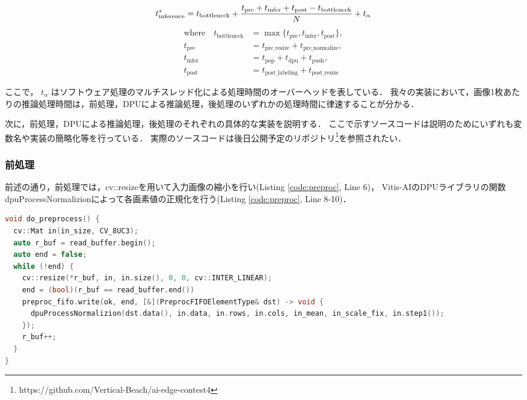 \begin{equation}
  \label{equ:inference-pred}
    t_{\mathrm{inference}}^* = t_{\mathrm{bottleneck}} + \frac{t_{\mathrm{pre}} + t_{\mathrm{infer}} + t_{\mathrm{post}} - t_{\mathrm{bottleneck}}}{N} + t_\alpha \\
\end{equation}
\begin{equation*}
    \begin{split}
      \text{where} \quad
      t_{\mathrm{bottleneck}}  &= \max \{t_{\mathrm{pre}}, t_{\mathrm{infer}}, t_{\mathrm{post}}\}, \\
      t_{\mathrm{pre}}  &= t_{\mathrm{pre\_resize}} + t_{\mathrm{pre\_normalize}}, \\
      t_{\mathrm{infer}} &= t_{\mathrm{pop}} + t_{\mathrm{dpu}} + t_{\mathrm{push}}, \\
      t_{\mathrm{post}} &= t_{\mathrm{post\_labeling}} + t_{\mathrm{post\_resize}}
    \end{split}
\end{equation*}

ここで， $t_\alpha$ はソフトウェア処理のマルチスレッド化による処理時間のオーバーヘッドを表している．
我々の実装において，画像1枚あたりの推論処理時間は，前処理，DPUによる推論処理，後処理のいずれかの処理時間に律速することが分かる．

次に，前処理，DPUによる推論処理，後処理のそれぞれの具体的な実装を説明する．
ここで示すソースコードは説明のためにいずれも変数名や実装の簡略化等を行っている．
実際のソースコードは後日公開予定のリポジトリ\footnote{https://github.com/Vertical-Beach/ai-edge-contest4}を参照されたい．

\subsubsection{前処理}
前述の通り，前処理では，cv::resizeを用いて入力画像の縮小を行い(Listing \ref{code:preproc}, Line 6)，
Vitis-AIのDPUライブラリの関数dpuProcessNormalizionによって各画素値の正規化を行う(Listing \ref{code:preproc}, Line 8-10)．

\setcounter{lstnumber}{1}
\begin{lstlisting}[language=c++,firstnumber=last,caption=do\_preprocess(),label=code:preproc]
void do_preprocess() {
  cv::Mat in(in_size, CV_8UC3);
  auto r_buf = read_buffer.begin();
  auto end = false;
  while (!end) {
    cv::resize(*r_buf, in, in.size(), 0, 0, cv::INTER_LINEAR);
    end = (bool)(r_buf == read_buffer.end())
    preproc_fifo.write(ok, end, [&](PreprocFIFOElementType& dst) -> void {
      dpuProcessNormalizion(dst.data(), in.data, in.rows, in.cols, in_mean, in_scale_fix, in.step1());
    });
    r_buf++;
  }
}
\end{lstlisting}

